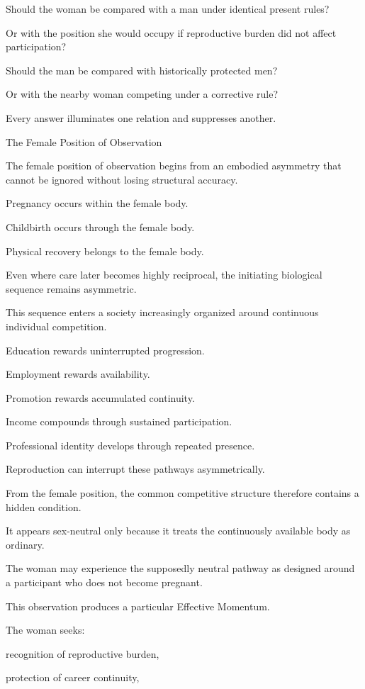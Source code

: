 Should the woman be compared with a man under identical present rules?

Or with the position she would occupy if reproductive burden did not affect participation?

Should the man be compared with historically protected men?

Or with the nearby woman competing under a corrective rule?

Every answer illuminates one relation and suppresses another.

The Female Position of Observation

The female position of observation begins from an embodied asymmetry that cannot be ignored without losing structural accuracy.

Pregnancy occurs within the female body.

Childbirth occurs through the female body.

Physical recovery belongs to the female body.

Even where care later becomes highly reciprocal, the initiating biological sequence remains asymmetric.

This sequence enters a society increasingly organized around continuous individual competition.

Education rewards uninterrupted progression.

Employment rewards availability.

Promotion rewards accumulated continuity.

Income compounds through sustained participation.

Professional identity develops through repeated presence.

Reproduction can interrupt these pathways asymmetrically.

From the female position, the common competitive structure therefore contains a hidden condition.

It appears sex-neutral only because it treats the continuously available body as ordinary.

The woman may experience the supposedly neutral pathway as designed around a participant who does not become pregnant.

This observation produces a particular Effective Momentum.

The woman seeks:

recognition of reproductive burden,

protection of career continuity,

